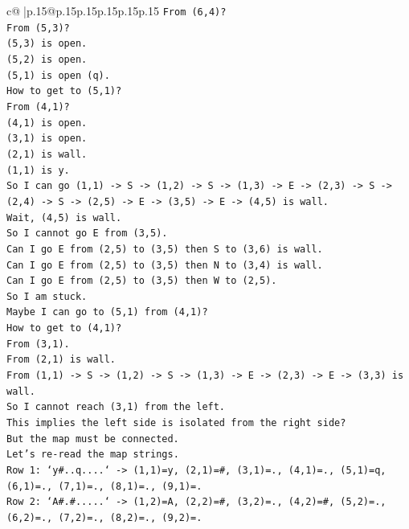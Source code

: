 \documentclass{article}
\begin{document}
{\begin{supertabular}{c@{$\;$}|p{.15\linewidth}@{}p{.15\linewidth}p{.15\linewidth}p{.15\linewidth}p{.15\linewidth}p{.15\linewidth}}
{{{\texttt{From (6,4)?} \\
\texttt{From (5,3)?} \\
\texttt{(5,3) is open.} \\
\texttt{(5,2) is open.} \\
\texttt{(5,1) is open (q).} \\
\texttt{How to get to (5,1)?} \\
\texttt{From (4,1)?} \\
\texttt{(4,1) is open.} \\
\texttt{(3,1) is open.} \\
\texttt{(2,1) is wall.} \\
\texttt{(1,1) is y.} \\
\texttt{So I can go (1,1) {-}> S {-}> (1,2) {-}> S {-}> (1,3) {-}> E {-}> (2,3) {-}> S {-}> (2,4) {-}> S {-}> (2,5) {-}> E {-}> (3,5) {-}> E {-}> (4,5) is wall.} \\
\texttt{Wait, (4,5) is wall.} \\
\texttt{So I cannot go E from (3,5).} \\
\texttt{Can I go E from (2,5) to (3,5) then S to (3,6) is wall.} \\
\texttt{Can I go E from (2,5) to (3,5) then N to (3,4) is wall.} \\
\texttt{Can I go E from (2,5) to (3,5) then W to (2,5).} \\
\texttt{So I am stuck.} \\
\texttt{Maybe I can go to (5,1) from (4,1)?} \\
\texttt{How to get to (4,1)?} \\
\texttt{From (3,1).} \\
\texttt{From (2,1) is wall.} \\
\texttt{From (1,1) {-}> S {-}> (1,2) {-}> S {-}> (1,3) {-}> E {-}> (2,3) {-}> E {-}> (3,3) is wall.} \\
\texttt{So I cannot reach (3,1) from the left.} \\
\texttt{This implies the left side is isolated from the right side?} \\
\texttt{But the map must be connected.} \\
\texttt{Let's re{-}read the map strings.} \\
\texttt{Row 1: `y\#..q....` {-}> (1,1)=y, (2,1)=\#, (3,1)=., (4,1)=., (5,1)=q, (6,1)=., (7,1)=., (8,1)=., (9,1)=.} \\
\texttt{Row 2: `A\#.\#.....` {-}> (1,2)=A, (2,2)=\#, (3,2)=., (4,2)=\#, (5,2)=., (6,2)=., (7,2)=., (8,2)=., (9,2)=.} \\
}}}
\end{supertabular}}
\end{document}
